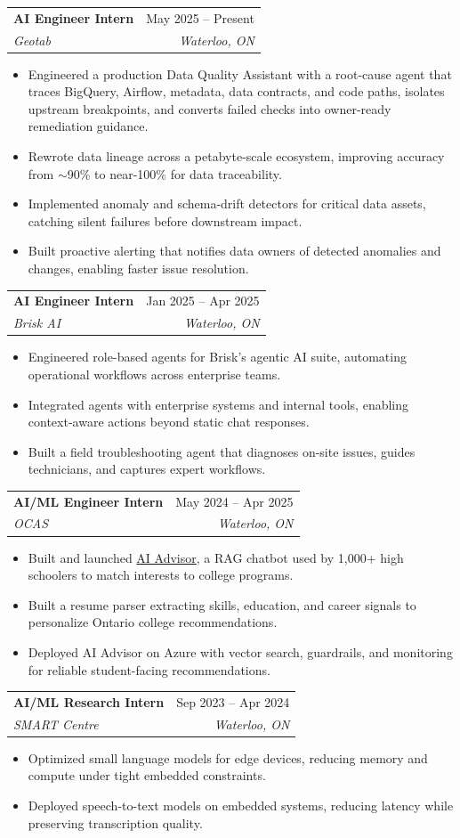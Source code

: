 \documentclass[letterpaper,10pt]{article}
\makeatletter
\newcommand{\resumeItem}[1]{
  \item\small{
    {#1 \vspace{-2pt}}
  }
}
\newcommand{\resumeSubheading}[4]{
  \vspace{-2pt}\item
    \begin{tabular*}{0.97\textwidth}[t]{l@{\extracolsep{\fill}}r}
      \textbf{#1} & #2 \\
      \textit{\small#3} & \textit{\small #4} \\
    \end{tabular*}\vspace{-7pt}
}
\newcommand{\resumeItemListStart}{\begin{itemize}}
\newcommand{\resumeItemListEnd}{\end{itemize}\vspace{-5pt}}
\makeatother
\begin{document}
    \resumeSubheading
      {AI Engineer Intern}{May 2025 -- Present}
      {Geotab}{Waterloo, ON}
      \resumeItemListStart
        \resumeItem{Engineered a production Data Quality Assistant with a root-cause agent that traces BigQuery, Airflow, metadata, data contracts, and code paths, isolates upstream breakpoints, and converts failed checks into owner-ready remediation guidance.}
        \resumeItem{Rewrote data lineage across a petabyte-scale ecosystem, improving accuracy from $\sim$90\% to near-100\% for data traceability.}
        \resumeItem{Implemented anomaly and schema-drift detectors for critical data assets, catching silent failures before downstream impact.}
        \resumeItem{Built proactive alerting that notifies data owners of detected anomalies and changes, enabling faster issue resolution.}
      \resumeItemListEnd
      \vspace{6pt}
      
    \resumeSubheading
      {AI Engineer Intern}{Jan 2025 -- Apr 2025}
      {Brisk AI}{Waterloo, ON}
      \resumeItemListStart
        \resumeItem{Engineered role-based agents for Brisk's agentic AI suite, automating operational workflows across enterprise teams.}
        \resumeItem{Integrated agents with enterprise systems and internal tools, enabling context-aware actions beyond static chat responses.}
        \resumeItem{Built a field troubleshooting agent that diagnoses on-site issues, guides technicians, and captures expert workflows.}
      \resumeItemListEnd
      \vspace{6pt}

    \resumeSubheading
      {AI/ML Engineer Intern}{May 2024 -- Apr 2025}
      {OCAS}{Waterloo, ON}
      \resumeItemListStart
        \resumeItem{Built and launched \href{https://advisor.beta.ontariocolleges.ca/}{AI Advisor}, a RAG chatbot used by 1,000+ high schoolers to match interests to college programs.}
        \resumeItem{Built a resume parser extracting skills, education, and career signals to personalize Ontario college recommendations.}
        \resumeItem{Deployed AI Advisor on Azure with vector search, guardrails, and monitoring for reliable student-facing recommendations.}
      \resumeItemListEnd
      \vspace{6pt}

    \resumeSubheading
      {AI/ML Research Intern}{Sep 2023 -- Apr 2024}
      {SMART Centre}{Waterloo, ON}
      \resumeItemListStart
        \resumeItem{Optimized small language models for edge devices, reducing memory and compute under tight embedded constraints.}
        \resumeItem{Deployed speech-to-text models on embedded systems, reducing latency while preserving transcription quality.}
      \resumeItemListEnd
\end{document}
